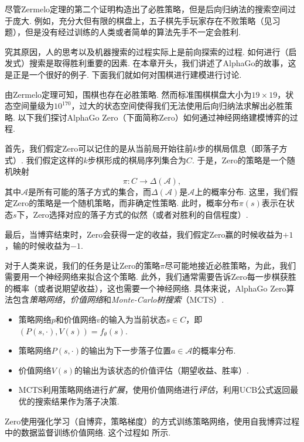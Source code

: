 尽管Zermelo定理的第二个证明构造出了必胜策略，但是后向归纳法的搜索空间过于庞大. 例如，充分大但有限的棋盘上，五子棋先手玩家存在不败策略（见习题），但是没有经过训练的人类或者简单的算法先手不一定会胜利. 

究其原因，人的思考以及机器搜索的过程实际上是前向探索的过程. 如何进行（启发式）搜索是取得胜利重要的因素. 在本章开头，我们讲述了AlphaGo的故事，这是正是一个很好的例子. 下面我们就如何对围棋进行建模进行讨论.

由Zermelo定理可知，围棋也存在必胜策略. 然而标准围棋棋盘大小为$19\times 19$，状态空间量级为$10^{170}$，过大的状态空间使得我们无法使用后向归纳法求解出必胜策略. 以下我们探讨AlphaGo Zero（下面简称Zero）如何通过神经网络建模博弈的过程.

首先，我们假定Zero可以记住的是从当前局开始往前$k$步的棋局信息（即落子方式）. 我们假定这样的$k$步棋形成的棋局序列集合为$C$. 于是，Zero的策略是一个随机映射
\[\pi: C\to \Delta(\mathcal A),\]
其中$\mathcal A$是所有可能的落子方式的集合，而$\Delta(\mathcal A)$是$\mathcal A$上的概率分布. 这里，我们假定Zero的策略是一个随机策略，而非确定性策略. 此时，概率分布$\pi(s)$表示在状态$s$下，Zero选择对应的落子方式的似然（或者对胜利的自信程度）.

最后，当博弈结束时，Zero会获得一定的收益，我们假定Zero赢的时候收益为$+1$，输的时候收益为$-1$. 

对于人类来说，我们的任务是让Zero的策略$\pi$尽可能地接近必胜策略，为此，我们需要用一个神经网络来拟合这个策略. 此外，我们通常需要告诉Zero每一步棋获胜的概率（或者说期望收益），这也需要一个神经网络. 具体来说，AlphaGo Zero算法包含\emph{策略网络}，\emph{价值网络}和\emph{Monte-Carlo树搜索}（MCTS）.
\begin{itemize}
    \item 策略网络$p$和价值网络$v$的输入为当前状态$s\in C$，即$(P(s,\cdot),V(s))=f_\theta(s)$.
    \item 策略网络$P(s,\cdot)$的输出为下一步落子位置$a\in\mathcal A$的概率分布.
    \item 价值网络$V(s)$的输出为该状态的价值评估（期望收益、胜率）.
    \item MCTS利用策略网络进行\emph{扩展}，使用价值网络进行\emph{评估}，利用UCB公式返回最优的搜索结果作为落子决策.
\end{itemize}

Zero使用强化学习（自博弈，策略梯度）的方式训练策略网络，使用自我博弈过程中的数据监督训练价值网络. 这个过程如 所示.

